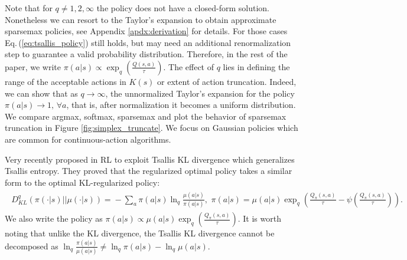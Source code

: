 \documentclass{article}
\newcommand{\AdaBracket}[1]{\left(#1\right)}
\newcommand{\qKLany}[2]{D^{q}_{\!K\!L}\!\left(#1 \left|  \right| #2 \right)}
\newcommand{\eq}[1]{Eq.\,(#1)}
\begin{document}
  Note that for $q\neq 1,2,\infty$ the policy does not have a closed-form solution. 
  Nonetheless we can resort to the Taylor's expansion to obtain approximate sparsemax policies, see Appendix \ref{apdx:derivation} for details. 
  For those cases \eq{\ref{eq:tsallis_policy}} still holds, but may need an additional renormalization step to guarantee a valid probability distribution. 
  Therefore, in the rest of the paper, we write $\pi(a|s) \propto \exp_q\AdaBracket{\frac{Q(s,a)}{\tau}}$.
  The effect of $q$ lies in defining the range of the acceptable actions in $K(s)$ or extent of action truncation. 
  Indeed, we can show that as $q \rightarrow \infty$, the unnormalized Taylor's expansion for the policy $\pi(a|s) \rightarrow 1, \, \forall a$, that is, after normalization it becomes a uniform distribution.
  We compare argmax, softmax, sparsemax and plot the behavior of sparsemax truncation in Figure \ref{fig:simplex_truncate}.
  We focus on Gaussian policies which are common for continuous-action algorithms.


Very recently \citet{zhu2023generalized} proposed in RL to exploit Tsallis KL divergence \citep{Furuichi2004-fundamentals-qKL} which generalizes Tsallis entropy.  
They proved that the regularized optimal policy takes a similar form to the optimal KL-regularized policy:
\begin{align}
    \begin{split}
        \qKLany{\pi(\cdot|s)}{\mu(\cdot|s)} \!=\! -\sum_a \pi(a|s) \ln_{q} \frac{\mu(a|s)}{\pi(a|s)}, \,\, \pi(a|s) = \mu(a|s) \exp_q\AdaBracket{\frac{Q_{\pi}(s,a)}{\tau} - \psi\AdaBracket{\frac{Q_{\pi}(s,a)}{\tau}} \!}.
    \end{split}
    \label{eq:tkl_policy}
\end{align}
We also write the policy as $\pi(a|s)\propto \mu(a|s)\exp_q\AdaBracket{\frac{Q_{\pi}(s,a)}{\tau}}$.
It is worth noting that unlike the KL divergence, the Tsallis KL divergence cannot be decomposed as $\ln_q\!\frac{\pi(a|s)}{\mu(a|s)} \neq \ln_q \pi(a|s) - \ln_q \mu(a|s)$.
\end{document}
